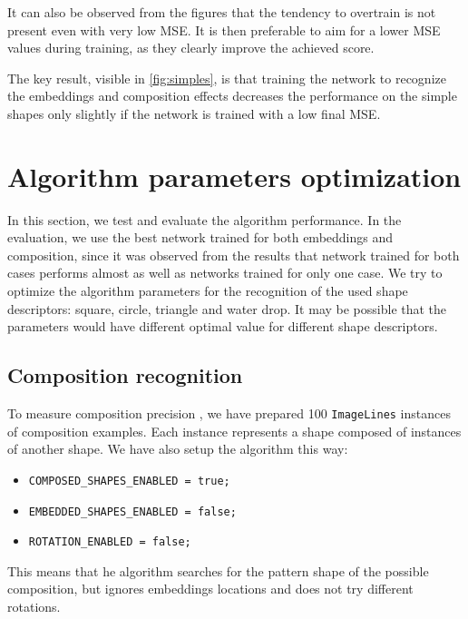 It can also be observed from the figures that the tendency to overtrain is not present even with very low MSE. It is then  preferable to aim for a lower MSE values during training, as they  clearly improve the achieved score.

 The key result, visible in \cref{fig:simples}, is that training the network to recognize the embeddings and composition effects decreases the performance on the simple shapes only slightly if the network is trained with  a low final MSE.

\section{Algorithm parameters optimization}
In this section, we test and evaluate the  algorithm performance. In the evaluation, we use the best network trained for both embeddings and composition, since it was observed from the results\XX{,} that  network trained for both cases performs almost as well as networks trained for only one case. We try  to optimize the algorithm parameters for the recognition of the used shape descriptors: square, circle, triangle and water drop. It may be possible that the parameters would have different optimal value for different shape descriptors. 


\subsection{Composition recognition}
To measure composition precision , we have prepared 100 \texttt{ImageLines} instances of composition examples. Each instance represents a shape composed of instances of another shape. We have also setup the algorithm this way:
\begin{itemize}
\item \texttt{COMPOSED\_SHAPES\_ENABLED = true;}
\item \texttt{EMBEDDED\_SHAPES\_ENABLED = false;}
\item \texttt{ROTATION\_ENABLED = false;}
\end{itemize} 
This means that he algorithm searches for the pattern shape of the possible composition, but ignores embeddings locations and does not try  different rotations.

